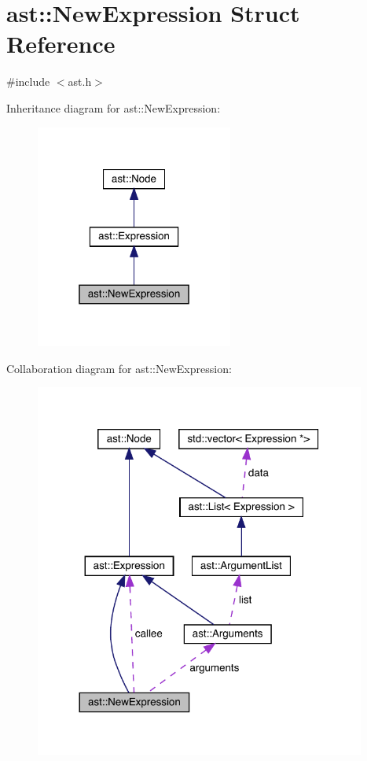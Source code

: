 \hypertarget{structast_1_1_new_expression}{}\section{ast\+:\+:New\+Expression Struct Reference}
\label{structast_1_1_new_expression}


{\ttfamily \#include $<$ast.\+h$>$}



Inheritance diagram for ast\+:\+:New\+Expression\+:
\nopagebreak
\begin{figure}[H]
\begin{center}
\leavevmode
\includegraphics[width=184pt]{structast_1_1_new_expression__inherit__graph}
\end{center}
\end{figure}


Collaboration diagram for ast\+:\+:New\+Expression\+:
\nopagebreak
\begin{figure}[H]
\begin{center}
\leavevmode
\includegraphics[width=308pt]{structast_1_1_new_expression__coll__graph}
\end{center}
\end{figure}
